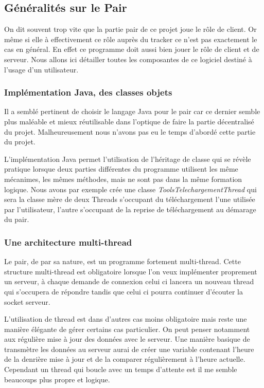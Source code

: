 


\subsection{Généralités sur le Pair}
On dit souvent trop vite que la partie pair de ce projet joue le rôle
de client. Or même si elle à effectivement ce rôle auprès du tracker
ce n'est pas exactement le cas en général. En effet ce programme doit
aussi bien jouer le rôle de client et de serveur. Nous allons ici
détailler toutes les composantes de ce logiciel destiné à l'usage d'un
utilisateur.

\subsubsection{Implémentation Java, des classes objets}
Il a semblé pertinent de choisir le langage Java pour le pair car ce
dernier semble plus maléable et mieux réutilisable dans l'optique de
faire la partie décentralisé du projet. Malheureusement nous n'avons
pas eu le temps d'abordé cette partie du projet.

L'implémentation Java permet l'utilisation de l'héritage de classe qui
se révèle pratique lorsque deux parties différentes du programme
utilisent les même mécanimes, les mêmes méthodes, mais ne sont pas
dans la même formation logique. Nous avons par exemple crée une classe
\textit{ToolsTelechargementThread} qui sera la classe mère de deux
Threads s'occupant du téléchargement l'une utilisée par l'utilisateur,
l'autre s'occupant de la reprise de téléchargement au démarage du
pair.

\subsubsection{Une architecture multi-thread}
Le pair, de par sa nature, est un programme fortement
multi-thread. Cette structure multi-thread est obligatoire lorsque
l'on veux implémenter proprement un serveur, à chaque demande de
connexion celui ci lancera un nouveau thread qui s'occupera de
répondre tandis que celui ci pourra continuer d'écouter la socket
serveur.

L'utilisation de thread est dans d'autres cas moins obligatoire mais
reste une manière élégante de gérer certains cas particulier. On peut
penser notamment aux régulière mise à jour des données avec le
serveur. Une manière basique de transmètre les données au serveur
aurai de créer une variable contenant l'heure de la denrière mise à
jour et de la comparer régulièrement à l'heure actuelle. Cependant un
thread qui boucle avec un temps d'attente est il me semble beaucoups
plus propre et logique.

